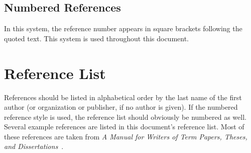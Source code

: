 \subsection{Numbered References}

In this system, the reference number appears in square brackets following the
quoted text.  This system is used throughout this document.

\section{Reference List}

References should be listed in alphabetical order by the last name of the first
author (or organization or publisher, if no author is given).  If the numbered
reference style is used, the reference list should obviously be numbered as
well.  Several example references are listed in this document's reference list.
Most of these references are taken from \textit{A Manual for Writers of Term
Papers, Theses, and Dissertations}~\cite{Turabian}.

